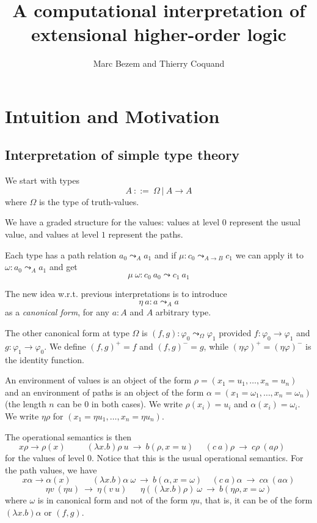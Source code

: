 \documentclass[10pt,a4paper]{article}
\begin{document}
\title{A computational interpretation of extensional higher-order logic}
\author{Marc Bezem and Thierry Coquand}
\date{}
\maketitle


\section{Intuition and Motivation}
\subsection{Interpretation of simple type theory}

 We start with types
$$
A~::=~\Omega~|~A\rightarrow A
$$
where $\Omega$ is the type of truth-values.

\medskip

 We have a graded structure for the values: values at level $0$ represent the usual value, and
values at level $1$ represent the paths.

\medskip

 Each type has a path relation $a_0\leadsto _A a_1$ and if $\mu:c_0\leadsto_{A\rightarrow B} c_1$ 
we can apply it to $\omega:a_0\leadsto _{A} a_1$ and get
$$
\mu~\omega:c_0~a_0\leadsto c_1~a_1
$$


\medskip

 The new idea w.r.t. previous interpretations is to introduce
$$
\eta~a: a\leadsto _A a
$$
as a {\em canonical form}, for any $a:A$ and $A$ arbitrary type.

\medskip

 The other canonical form at type $\Omega$ is $(f,g):\varphi_0\leadsto_{\Omega} \varphi_1$ provided
$f:\varphi_0\rightarrow\varphi_1$ and $g:\varphi_1\rightarrow \varphi_0$.
 We define $(f,g)^+ = f$ and $(f,g)^- = g$, while $(\eta\varphi)^+ = (\eta\varphi)^-$ is the identity function.

\medskip

 An environment of values is an object of the form $\rho = (x_1=u_1,\dots,x_n = u_n)$ and
an environment of paths is an object of the form $\alpha = (x_1 = \omega_1,\dots,x_n=\omega_n)$
(the length $n$ can be $0$ in both cases). We write $\rho(x_i) = u_i$ and $\alpha(x_i) = \omega_i$.
We write $\eta\rho$ for $(x_1=\eta u_1,\dots,x_n = \eta u_n)$.

\medskip

 The operational semantics is then
$$
x\rho\rightarrow \rho(x)~~~~~~~~~~~
(\lambda x.b)\rho~u ~\rightarrow~ b(\rho,x=u)~~~~~~(c~a)\rho ~\rightarrow~ c\rho~(a\rho)~~~~~~~
$$
for the values of level $0$. Notice that this is the usual operational semantics.
For the path values, we have
$$
x\alpha\rightarrow \alpha(x)~~~~~~~~~~~
(\lambda x.b)\alpha~\omega ~\rightarrow~ b(\alpha,x=\omega)~~~~~(c~a)\alpha ~\rightarrow~ c\alpha~(a\alpha)
$$
$$
\eta v~(\eta u) ~\rightarrow~ \eta (v~u)~~~~~~~
\eta ((\lambda x.b)\rho)~\omega ~\rightarrow~ b(\eta\rho,x=\omega)
$$
where $\omega$ is in canonical form and not of the form $\eta u$,
that is, it can be of the form $(\lambda x.b)\alpha$ or $(f,g)$.
\end{document}
